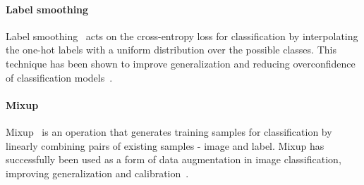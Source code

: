 \documentclass[final]{cvpr}
\begin{document}
\paragraph{Label smoothing}
Label smoothing~\cite{label_smoothing} acts on the cross-entropy loss for classification by interpolating the one-hot labels with a uniform distribution over the possible classes. This technique has been shown to improve generalization and reducing overconfidence of classification models~\cite{label_smoothing}. 


\paragraph{Mixup}
Mixup~\cite{mixup} is an operation that generates training samples for classification by linearly combining pairs of existing samples - image and label. 
Mixup has successfully been used as a form of data augmentation in image classification, improving generalization and calibration~\cite{mixup, thulasidasanmixup}. 
\end{document}
